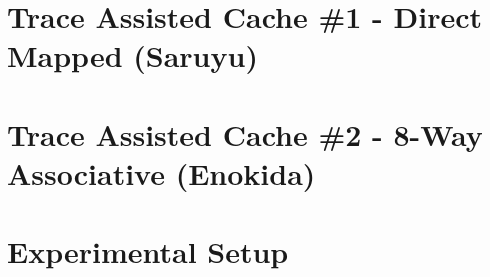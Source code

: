 



\section{Trace Assisted Cache \#1 - Direct Mapped (Saruyu)}

\section{Trace Assisted Cache \#2 - 8-Way Associative (Enokida)}

\section{Experimental Setup}

